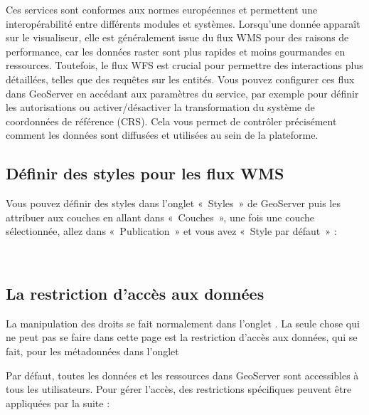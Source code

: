 \documentclass[letterpaper,10pt,french]{sphinxmanual}
\let\sphinxpxdimen\pdfpxdimen\else\newdimen\sphinxpxdimen
\begin{document}
\sphinxAtStartPar
Ces services sont conformes aux normes européennes et permettent une interopérabilité entre différents modules et systèmes. Lorsqu’une
donnée apparaît sur le visualiseur, elle est généralement issue du flux WMS pour des raisons de performance, car les données raster sont plus
rapides et moins gourmandes en ressources. Toutefois, le flux WFS est crucial pour permettre des interactions plus détaillées, telles que des requêtes sur les entités.
Vous pouvez configurer ces flux dans GeoServer en accédant aux paramètres du service, par exemple pour définir les autorisations ou activer/désactiver la
transformation du système de coordonnées de référence (CRS). Cela vous permet de contrôler précisément comment les données sont diffusées et utilisées au sein de la plateforme.


\subsection{Définir des styles pour les flux WMS}
\label{\detokenize{doc_admin/services:definir-des-styles-pour-les-flux-wms}}
\sphinxAtStartPar
Vous pouvez définir des styles dans l’onglet « Styles » de GeoServer puis les attribuer aux couches en allant dans « Couches », une fois une couche
sélectionnée, allez dans « Publication » et vous avez « Style par défaut » :

\noindent{\hspace*{\fill}\sphinxincludegraphics[width=700\sphinxpxdimen]{{styles}.png}\hspace*{\fill}}

\sphinxAtStartPar
 


\subsection{La restriction d’accès aux données}
\label{\detokenize{doc_admin/services:la-restriction-d-acces-aux-donnees}}
\sphinxAtStartPar
La manipulation des droits se fait normalement dans l’onglet {\hyperref[\detokenize{doc_admin/utilisateurs:utilisateur}]{}}. La seule chose qui ne peut pas se faire dans cette page
est la restriction d’accès aux données, qui se fait, pour les métadonnées dans l’onglet {\hyperref[\detokenize{doc_admin/catalogue:privileges}]{}}

\sphinxAtStartPar
Par défaut, toutes les données et les ressources dans GeoServer sont accessibles à tous les utilisateurs.
Pour gérer l’accès, des restrictions spécifiques peuvent être appliquées par la suite :
\end{document}
